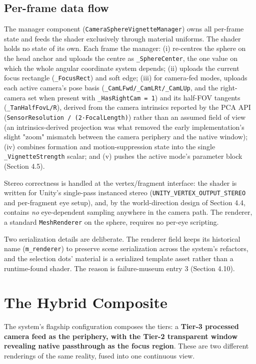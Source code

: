 \subsection{Per-frame data flow}

The manager component (\verb|CameraSphereVignetteManager|) owns all per-frame state and feeds the shader
exclusively through material uniforms. The shader holds no state of its own. Each frame the manager:
(i) re-centres the sphere on the head anchor and uploads the centre as \verb|_SphereCenter|, the one
value on which the whole angular coordinate system depends; (ii) uploads the current focus rectangle
(\verb|_FocusRect|) and soft edge; (iii) for camera-fed modes, uploads each active camera's pose basis
(\verb|_CamLFwd/_CamLRt/_CamLUp|, and the right-camera set when present with \verb|_HasRightCam = 1|) and its
half-FOV tangents (\verb|_TanHalfFovL/R|), derived from the camera intrinsics reported by the PCA API
(\verb|SensorResolution / (2·FocalLength)|) rather than an assumed field of view (an intrinsics-derived
projection was what removed the early implementation's slight "zoom" mismatch between the camera
periphery and the native window); (iv) combines formation and motion-suppression state into the single
\verb|_VignetteStrength| scalar; and (v) pushes the active mode's parameter block (Section 4.5).

Stereo correctness is handled at the vertex/fragment interface: the shader is written for Unity's
single-pass instanced stereo (\verb|UNITY_VERTEX_OUTPUT_STEREO| and per-fragment eye setup), and, by the
world-direction design of Section 4.4, contains \textit{no} eye-dependent sampling anywhere in the camera
path. The renderer, a standard \verb|MeshRenderer| on the sphere, requires no per-eye scripting.

Two serialization details are deliberate. The renderer field keeps its historical name
(\verb|m_renderer|) to preserve scene serialization across the system's refactors, and the selection
dots' material is a serialized template asset rather than a runtime-found shader. The reason is
failure-museum entry 3 (Section 4.10).

\section{The Hybrid Composite}

The system's flagship configuration composes the tiers: a \textbf{Tier-3 processed camera feed as the
periphery, with the Tier-2 transparent window revealing native passthrough as the focus region}.
These are two different renderings of the same reality, fused into one continuous view.

